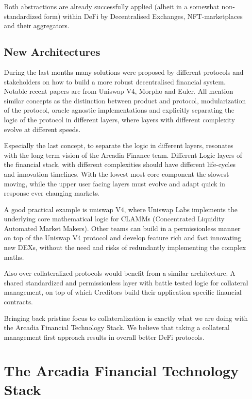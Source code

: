 \documentclass[sigconf,nonacm]{acmart}
\begin{document}
Both abstractions are already successfully applied (albeit in a somewhat non-standardized form) within DeFi by Decentralised Exchanges, NFT-marketplaces and their aggregators.

\subsection{New Architectures}
\label{subsec:new-architectures}
During the last months many solutions were proposed by different protocols and stakeholders on how to build a more robust decentralised financial system.
Notable recent papers are from Uniswap V4\cite{adams2023uniswap}, Morpho\cite{gontier2023morpho} and Euler\cite{euler2023protocols}.
All mention similar concepts as the distinction between product and protocol, modularization of the protocol, oracle agnostic implementations and explicitly separating the logic of the protocol in different layers,
where layers with different complexity evolve at different speeds.

Especially the last concept, to separate the logic in different layers, resonates with the long term vision of the Arcadia Finance team.
Different Logic layers of the financial stack, with different complexities should have different life-cycles and innovation timelines.
With the lowest most core component the slowest moving, while the upper user facing layers must evolve and adapt quick in response ever changing markets.

A good practical example is uniswap V4, where Uniswap Labs implements the underlying core mathematical logic for CLAMMs (Concentrated Liquidity Automated Market Makers).
Other teams can build in a permissionless manner on top of the Uniswap V4 protocol and develop feature rich and fast innovating new DEXs, without the need and risks of redundantly implementing the complex maths.

Also over-collateralized protocols would benefit from a similar architecture.
A shared standardized and permissionless layer with battle tested logic for collateral management, on top of which Creditors build their application specific financial contracts.

Bringing back pristine focus to collateralization is exactly what we are doing with the Arcadia Financial Technology Stack.
We believe that taking a collateral management first approach results in overall better DeFi protocols.


\section{The Arcadia Financial Technology Stack}
\end{document}
